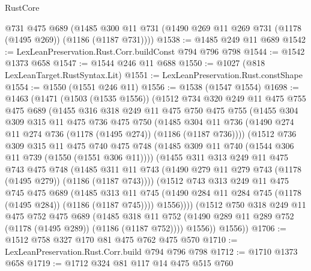 \begin{lexlean}{RustCore}
\begin{coremodule}
    @731
    @475
    @689
    (@1485 @300 @11 @731 (@1490 @269 @11 @269 @731 (@1178 (@1495 @269)) (@1186 (@1187 @731))))
@1538 := @1485 @249 @11 @689
@1542 := LexLeanPreservation.Rust.Corr.buildConst @794 @796 @798
@1544 := @1542 @1373 @658
@1547 := @1544 @246 @11 @688
@1550 := @1027 (@818 LexLeanTarget.RustSyntax.Lit)
@1551 := LexLeanPreservation.Rust.constShape
@1554 := @1550 (@1551 @246 @11)
@1556 := @1538 (@1547 @1554)
@1698 := @1463
    (@1471
      (@1503 (@1535 @1556))
      (@1512
        @734
        @320
        @249
        @11
        @475
        @755
        @475
        @689
        (@1455
          @316
          @318
          @249
          @11
          @475
          @750
          @475
          @755
          (@1455
            @304
            @309
            @315
            @11
            @475
            @736
            @475
            @750
            (@1485
              @304
              @11
              @736
              (@1490 @274 @11 @274 @736 (@1178 (@1495 @274)) (@1186 (@1187 @736))))
            (@1512
              @736
              @309
              @315
              @11
              @475
              @740
              @475
              @748
              (@1485 @309 @11 @740 (@1544 @306 @11 @739 (@1550 (@1551 @306 @11))))
              (@1455
                @311
                @313
                @249
                @11
                @475
                @743
                @475
                @748
                (@1485
                  @311
                  @11
                  @743
                  (@1490 @279 @11 @279 @743 (@1178 (@1495 @279)) (@1186 (@1187 @743))))
                (@1512
                  @743
                  @313
                  @249
                  @11
                  @475
                  @745
                  @475
                  @689
                  (@1485
                    @313
                    @11
                    @745
                    (@1490 @284 @11 @284 @745 (@1178 (@1495 @284)) (@1186 (@1187 @745))))
                  @1556))))
          (@1512
            @750
            @318
            @249
            @11
            @475
            @752
            @475
            @689
            (@1485
              @318
              @11
              @752
              (@1490 @289 @11 @289 @752 (@1178 (@1495 @289)) (@1186 (@1187 @752))))
            @1556))
        @1556))
@1706 := @1512 @758 @327 @170 @81 @475 @762 @475 @570
@1710 := LexLeanPreservation.Rust.Corr.build @794 @796 @798
@1712 := @1710 @1373 @658
@1719 := @1712 @324 @81 @117 @14 @475 @515 @760

\end{coremodule}
\end{lexlean}
